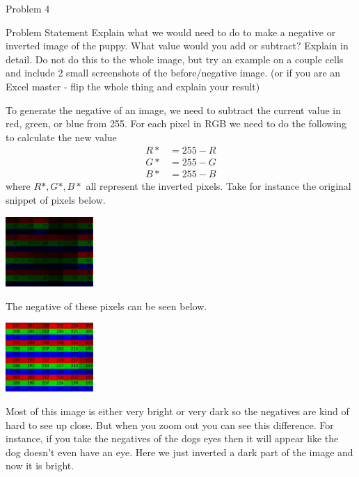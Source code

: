 \begin{problem}{Problem 4}
    \begin{statement}{Problem Statement}
        Explain what we would need to do to make a negative or inverted image of the puppy. What value would you add or subtract? Explain in detail. Do not do this to the whole image, but try an example 
        on a couple cells and include 2  small screenshots of the before/negative image. (or if you are an Excel master - flip the whole thing and explain your result)
    \end{statement}

    \begin{highlight}[Solution]
        To generate the negative of an image, we need to subtract the current value in red, green, or blue from 255. For each pixel in RGB we need to do the following to calculate the new value
        \begin{align*}
            R* & = 255 - R \\
            G* & = 255 - G \\
            B* & = 255 - B 
        \end{align*}
        where $R*,G*,B*$ all represent the inverted pixels. Take for instance the original snippet of pixels below.

        \begin{center}
            \includegraphics[width=0.25\textwidth]{Images/Original.png}
        \end{center}
        The negative of these pixels can be seen below.

        \begin{center}
            \includegraphics[width=0.25\textwidth]{Images/New.png}
        \end{center}
        Most of this image is either very bright or very dark so the negatives are kind of hard to see up close. But when you zoom out you can see this difference. For instance, if you take the negatives
        of the dogs eyes then it will appear like the dog doesn't even have an eye. Here we just inverted a dark part of the image and now it is bright.
    \end{highlight}
\end{problem}

